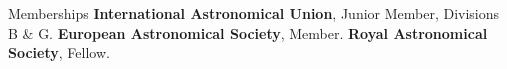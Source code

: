 \begin{rubric}{Memberships}
\entry*[2023 -- ~~~~~\,\,\,~~~]
    \textbf{International Astronomical Union}, Junior Member, Divisions B \& G.
\entry*[2021 -- ~~~~~\,\,\,~~~]
    \textbf{European Astronomical Society}, Member.
\entry*[2016 -- ~~~~~\,\,\,~~~]
    \textbf{Royal Astronomical Society}, Fellow.

\end{rubric}